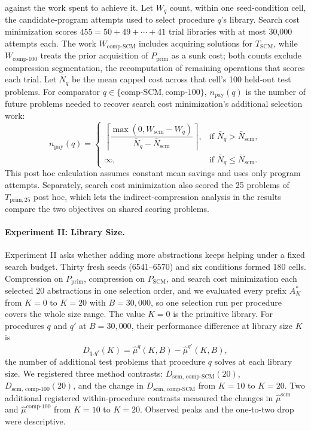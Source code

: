 \documentclass[10pt]{article}
\begin{document}
against the work spent to achieve it.
Let $W_q$ count, within one seed-condition cell, the candidate-program
attempts used to select procedure $q$'s library. Search cost minimization
scores $455=50+49+\cdots+41$ trial libraries with at most 30,000 attempts
each. The work $W_{\mathrm{comp\text{-}SCM}}$ includes acquiring solutions
for $T_{\mathrm{SCM}}$, while $W_{\mathrm{comp\text{-}100}}$ treats the
prior acquisition of $P_{\mathrm{prim}}$ as a sunk cost; both counts
exclude compression segmentation, the recomputation of remaining operations
that scores each trial.
Let $\bar N_q$ be the mean capped cost across that cell's 100 held-out test
problems. For comparator
$q\in\{\mathrm{comp\text{-}SCM},\mathrm{comp\text{-}100}\}$,
$n_{\mathrm{pay}}(q)$ is the number of future problems needed to recover
search cost minimization's additional selection work:
\begin{equation}
  n_{\mathrm{pay}}(q)
  =
  \begin{cases}
    \left\lceil
      \dfrac{\max(0,W_{\mathrm{scm}}-W_q)}
            {\bar N_q-\bar N_{\mathrm{scm}}}
    \right\rceil,
      & \text{if } \bar N_q>\bar N_{\mathrm{scm}},\\
    \infty,
      & \text{if } \bar N_q\leq\bar N_{\mathrm{scm}}.
  \end{cases}
\end{equation}
This post hoc calculation assumes constant mean savings and uses only program
attempts. Separately, search cost minimization also scored the 25 problems of
$T_{\mathrm{prim,25}}$ post hoc, which lets the indirect-compression
analysis in the results compare the two objectives on shared scoring
problems.

\paragraph{Experiment II: Library Size.}
Experiment II asks whether adding more abstractions keeps helping under a
fixed search budget. Thirty fresh seeds (6541--6570) and six conditions
formed 180 cells. Compression on $P_{\mathrm{prim}}$, compression on
$P_{\mathrm{SCM}}$, and search cost minimization each selected 20
abstractions in one selection order, and we evaluated every prefix
$A^{*}_{K}$ from $K=0$ to $K=20$ with $B=30{,}000$, so one selection run per
procedure covers the whole size range. The value $K=0$ is the primitive
library. For procedures $q$ and $q'$ at $B=30{,}000$, their performance
difference at library size $K$ is
\begin{equation}
  D_{q,q'}(K)
    =\widehat\mu^{q}(K,B)-\widehat\mu^{q'}(K,B),
\end{equation}
the number of additional test problems that procedure $q$ solves at each
library size. We registered three method contrasts:
$D_{\mathrm{scm},\,\mathrm{comp\text{-}SCM}}(20)$,
$D_{\mathrm{scm},\,\mathrm{comp\text{-}100}}(20)$, and the change in
$D_{\mathrm{scm},\,\mathrm{comp\text{-}SCM}}$ from $K=10$ to $K=20$.
Two additional registered within-procedure contrasts measured the changes in
$\widehat\mu^{\mathrm{scm}}$ and $\widehat\mu^{\mathrm{comp\text{-}100}}$
from $K=10$ to $K=20$.
Observed peaks and the one-to-two drop were descriptive.
\end{document}
